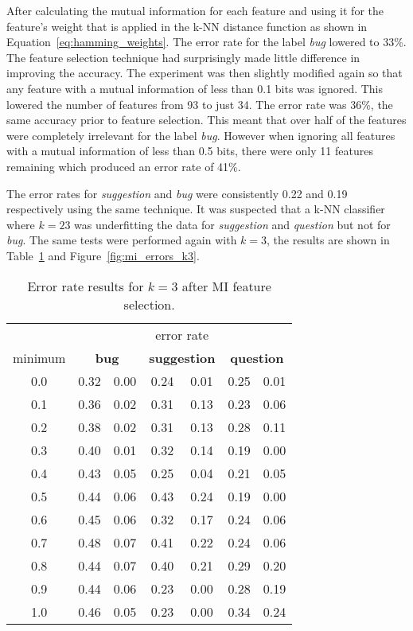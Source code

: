 After calculating the mutual information for each feature and using it for the feature's weight that is applied in the k-NN
distance function as shown in Equation~\ref{eq:hamming_weights}. The error rate for the label \textit{bug} lowered to 33\%. The
feature selection technique had surprisingly made little difference in improving the accuracy. The experiment was then slightly
modified again so that any feature with a mutual information of less than 0.1 bits was ignored. This lowered the number of
features from 93 to just 34. The error rate was 36\%, the same accuracy prior to feature selection. This meant that over half of
the features were completely irrelevant for the label \textit{bug}. However when ignoring all features with a mutual information
of less than 0.5 bits, there were only 11 features remaining which produced an error rate of 41\%.

The error rates for \textit{suggestion} and \textit{bug} were consistently 0.22 and 0.19 respectively using the same technique.
It was suspected that a k-NN classifier where $k = 23$ was underfitting the data for \textit{suggestion} and \textit{question}
but not for \textit{bug}. The same tests were performed again with $k = 3$, the results are shown in
Table~\ref{tbl:mi_errors_k3} and Figure~\ref{fig:mi_errors_k3}.

\begin{table}[h]
    \centering
    \begin{tabular}{|c||cc|cc|cc|}
    \hline

    & \multicolumn{6}{c|}{error rate} \\

    minimum &
    \multicolumn{2}{c|}{\textbf{bug}} &
    \multicolumn{2}{c|}{\textbf{suggestion}} &
    \multicolumn{2}{c|}{\textbf{question}}
    
    \\
    \hline

    0.0 & 0.32 & 0.00 & 0.24 & 0.01 & 0.25 & 0.01 \\
    0.1 & 0.36 & 0.02 & 0.31 & 0.13 & 0.23 & 0.06 \\
    0.2 & 0.38 & 0.02 & 0.31 & 0.13 & 0.28 & 0.11 \\
    0.3 & 0.40 & 0.01 & 0.32 & 0.14 & 0.19 & 0.00 \\
    0.4 & 0.43 & 0.05 & 0.25 & 0.04 & 0.21 & 0.05 \\
    0.5 & 0.44 & 0.06 & 0.43 & 0.24 & 0.19 & 0.00 \\
    0.6 & 0.45 & 0.06 & 0.32 & 0.17 & 0.24 & 0.06 \\
    0.7 & 0.48 & 0.07 & 0.41 & 0.22 & 0.24 & 0.06 \\
    0.8 & 0.44 & 0.07 & 0.40 & 0.21 & 0.29 & 0.20 \\
    0.9 & 0.44 & 0.06 & 0.23 & 0.00 & 0.28 & 0.19 \\
    1.0 & 0.46 & 0.05 & 0.23 & 0.00 & 0.34 & 0.24 \\

    \hline
    \end{tabular}
    \caption{Error rate results for $k = 3$ after MI feature selection.}
    \label{tbl:mi_errors_k3}
\end{table}

